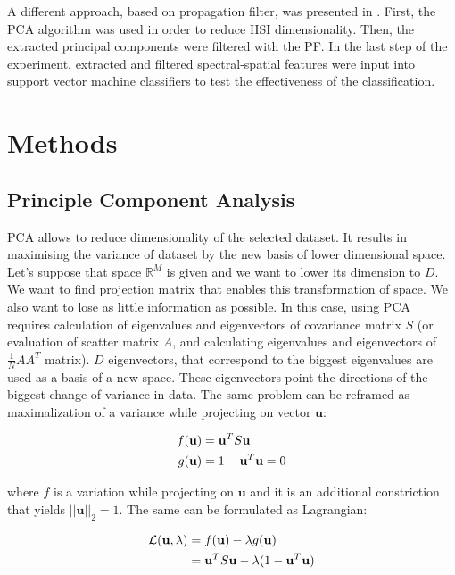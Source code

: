 \documentclass[a4paper, 10 pt, journal]{ieeeconf}
\newcommand{\bb}{\textbf}
\begin{document}
A different approach, based on propagation filter, was presented in \cite{propagation-filter}. First, the PCA algorithm was used in order to reduce HSI dimensionality. Then, the extracted principal components were filtered with the PF. In the last step of the experiment, extracted and filtered spectral-spatial features were input into support vector machine classifiers to test the effectiveness of the classification.

\section{Methods}

\subsection{Principle Component Analysis}
PCA allows to reduce dimensionality of the selected dataset. It results in maximising the variance of dataset by the new basis of lower dimensional space. Let's suppose that space $\mathbb{R}^{M}$ is given and we want to lower its dimension to $D$. We want to find projection matrix that enables this transformation of space. We also want to lose as little information as possible. In this case, using PCA requires calculation of eigenvalues and eigenvectors of covariance matrix $S$ (or evaluation of scatter matrix $A$, and calculating eigenvalues and eigenvectors of $\frac{1}{N}AA^{T}$ matrix). $D$ eigenvectors, that correspond to the biggest eigenvalues are used as a basis of a new space. These eigenvectors point the directions of the biggest change of variance in data.  The same problem can be reframed as maximalization of  a variance while projecting on vector $\bb{u}$:

\begin{align}
	f(\bb{u}) &= \bb{u}^T S \bb{u} \\
	g(\bb{u}) &= 1 - \bb{u}^T \bb{u} = 0   \notag
\end{align}

where $f$ is a variation while projecting on $\bb{u}$ and it is an additional constriction that yields $||\bb{u}||_{2} = 1$. The same can be formulated as Lagrangian:

\begin{align}
	\mathcal{L}(\bb{u}, \lambda) &= f(\bb{u}) - \lambda g(\bb{u}) \\
	    &= \bb{u}^T S \bb{u} - \lambda (1 - \bb{u}^T \bb{u})   \notag
\end{align}
\end{document}
